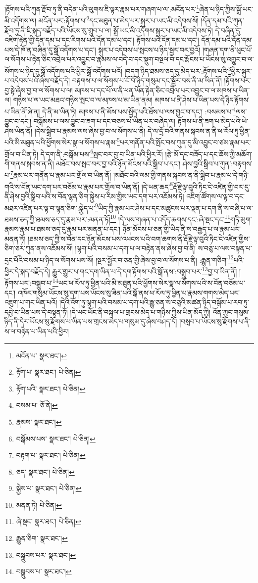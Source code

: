 །རྟོགས་པའི་ཀུན་རྫོབ་ཏུ་ནི་བདེན་པའི་ལུགས་ཇི་ལྟར་རྣམ་པར་གཞག་པ་ལ་:མངོན་པར་\footnote{མངོན་པ་  སྣར་ཐང་། }ཞེན་པ་ཉིད་ཀྱིས་སྒྲོ་ཡང་མི་འདོགས་ལ། མངོན་པར་:རྟོགས་པ་\footnote{རྟོག་པ་  སྣར་ཐང་།  པེ་ཅིན། }དང་མཐུན་པ་མེད་པར་སྐུར་པ་ཡང་མི་འདེབས་སོ། །དོན་དམ་པའི་ཀུན་རྫོབ་ཏུ་ནི་ཇི་སྐད་བརྗོད་པའི་ཡོངས་སུ་གྲུབ་པ་ལ། སྒྲོ་ཡང་མི་འདོགས་སྐུར་པ་ཡང་མི་འདེབས་ཏེ། དེ་བཞིན་དུ་འཇིག་རྟེན་གྱི་དོན་དམ་པ་དང་རིགས་པའི་དོན་དམ་པ་དང་། རྟོགས་པའི་དོན་དམ་པ་དང་། དོན་དམ་པའི་དོན་དམ་པས་དེ་ཁོ་ན་བཞིན་དུ་སྒྲོ་འདོགས་པ་དང་། སྐུར་པ་འདེབས་པ་སྤངས་པ་ཉིད་སྦྱར་བར་བྱའོ། །གཞན་དག་ནི་ཕུང་པོ་ལ་སོགས་པ་རྟེན་ཅིང་འབྲེལ་པར་འབྱུང་བ་རྣམས་ལ་བདེ་བ་དང་སྡུག་བསྔལ་བ་དང་རྨོངས་པ་ཡོངས་སུ་འགྱུར་བ་ལ་སོགས་པ་ཉིད་དུ་སྒྲོ་འདོགས་པའི་ཕྱིར་སྒྲོ་འདོགས་པའོ། །བདག་ཉིད་ཐམས་ཅད་དུ་མེད་པར་:རྟོགས་པའི་\footnote{རྟོག་པའི་  སྣར་ཐང་།  པེ་ཅིན། }ཕྱིར་སྐུར་པ་འདེབས་པའོ་ཞེས་བརྗོད་དེ། བརྟགས་པ་ལ་སོགས་པ་ངོ་བོ་ཉིད་གསུམ་དང་སྦྱོར་བས་ནི་མ་ཡིན་ནོ། །རྟོགས་པར་བྱ་སྟེ་ཞེས་བྱ་བ་ལ་སོགས་པ་ལ། མཁས་པ་དང་པོ་ལ་ནི་ཕན་ཡོན་རྟེན་ཅིང་འབྲེལ་པར་འབྱུང་བ་ལ་མཁས་པ་ཡིན་ལ། གཉིས་པ་ལ་ཡང་མཐའ་གཉིས་སྤང་བ་ལ་མཁས་པ་མ་ཡིན་ནམ། མཁས་པ་ནི་ཤེས་པ་ཡིན་པས་དེ་ཉིད་རྟོགས་པ་ཡིན་ནོ་ཞེ་ན། དེ་ནི་མ་ཡིན་ཏེ། མཁས་པ་ནི་མོས་པས་སྤྱོད་པའི་ཐོས་པ་ལས་བྱུང་བ་དང་། :བསམས་པ་\footnote{བསམ་པ་  ཅོ་ནེ། }ལས་བྱུང་བ་དང་། བསྒོམས་པ་ལས་བྱུང་བ་ཟག་པ་དང་བཅས་པ་ཡིན་པར་བཞེད་ལ། རྟོགས་པ་ནི་ཟག་པ་མེད་པའི་ཡེ་ཤེས་ཡིན་ནོ། །དེས་སྒྲིབ་པ་རྣམས་ལས་ཞེས་བྱ་བ་ལ་སོགས་པ་ནི། དེ་ལ་དྲོ་བའི་གནས་སྐབས་ན་ནི་ཕ་རོལ་ཏུ་ཕྱིན་པའི་མི་མཐུན་པའི་ཕྱོགས་སེར་སྣ་ལ་སོགས་པ་རྣམ་\footnote{རྣམས་  སྣར་ཐང་། }པར་གནོན་པའི་སྤོང་བས་ཀུན་དུ་མི་འབྱུང་བ་ཙམ་རྣམ་པར་གྲོལ་བ་ཡིན་ཏེ། དེ་དག་ནི་:བསྒོམ་པས་\footnote{བསྒོམས་པས་  སྣར་ཐང་།  པེ་ཅིན། }སྤང་བར་བྱ་བ་ཡིན་པའི་ཕྱིར་རོ། །རྩེ་མོ་དང་བཟོད་པ་དང་ཆོས་ཀྱི་མཆོག་གི་གནས་སྐབས་ན་ནི། མཐོང་བས་སྤང་བར་བྱ་བའི་ཉོན་མོངས་པའི་སྒྲིབ་པ་དང་། ཤེས་བྱའི་སྒྲིབ་པ་ཀུན་:བརྟགས་པ་\footnote{བརྟག་པ་  སྣར་ཐང་།  པེ་ཅིན། }རྣམ་པར་གནོན་པ་རྣམ་པར་གྲོལ་བ་ཡིན་ནོ། །མཐོང་བའི་ལམ་གྱི་གནས་སྐབས་ན་ནི་སྒྲིབ་པ་རྣམ་པ་དེ་གཉི་གའི་ས་བོན་ཡང་དག་པར་བཅོམ་པ་རྣམ་པར་གྲོལ་བ་ཡིན་ནོ། །དེ་ཡན་ཆད་\footnote{ཅད་  སྣར་ཐང་།  པེ་ཅིན། }རྡོ་རྗེ་ལྟ་བུའི་ཏིང་ངེ་འཛིན་གྱི་བར་དུ་ནི་ཤེས་བྱའི་སྒྲིབ་པའི་ས་བོན་ལྷན་ཅིག་སྐྱེས་པ་རིམ་གྱིས་ཡང་དག་པར་འཇོམས་ཏེ། འཇིག་ཚོགས་ལ་ལྟ་བ་དང་མཐར་འཛིན་པར་ལྟ་བ་ལྷན་ཅིག་:སྐྱེད་པ་\footnote{སྐྱེས་པ་  སྣར་ཐང་།  པེ་ཅིན། }ཡིད་ཀྱི་རྣམ་པར་ཤེས་པ་དང་མཚུངས་པར་ལྡན་པ་དག་ནི་ས་བཞི་པ་ལ་ཐམས་ཅད་ཀྱི་ཐམས་ཅད་དུ་རྣམ་པར་:མནན་ཏོ།\footnote{མནན་ཏེ།  པེ་ཅིན། } །དེ་ལས་གཞན་པ་འདོད་ཆགས་དང་:ཞེ་སྡང་དང་\footnote{ཞེ་སྡང་  སྣར་ཐང་།  པེ་ཅིན། }གཏི་མུག་རྣམས་རྣམ་པ་ཐམས་ཅད་དུ་རྣམ་པར་མནན་པ་དང་། ཉོན་མོངས་པ་ཅན་གྱི་ཡིད་ནི་ས་བརྒྱད་པ་ལ་རྣམ་པར་མནན་ཏོ། །ཐམས་ཅད་ཀྱི་ས་བོན་དང་ཉོན་མོངས་པས་འཕངས་པའི་བག་ཆགས་ནི་རྡོ་རྗེ་ལྟ་བུའི་ཏིང་ངེ་འཛིན་གྱིས་ཅིག་ཅར་ཀུན་ནས་འཇོམས་སོ། །ལྷག་པའི་བསམ་པ་དག་པ་ལ་བརྟེན་ནས་ཞེས་བྱ་བ་ནི། ས་བཅུ་པ་ལས་བསྟན་པ་དྲང་པོའི་བསམ་པ་ཉིད་ལ་སོགས་པས་སོ། །སྔར་སྦྱོར་བ་ཅན་གྱི་ཞེས་བྱ་བ་ལ་སོགས་པ་ནི། :རྒྱུན་གཅིག་\footnote{རྒྱུན་ཅིག་  སྣར་ཐང་། }པའི་ཕྱིར་དེ་སྐད་བརྗོད་དེ། རྒྱུར་གྱུར་པ་གང་དག་ཡིན་པ་དེ་དག་རྟོགས་པའི་སྒོ་ནས་:བསྒྲུབ་པར་\footnote{བསྒྲུབས་པར་  སྣར་ཐང་། }བྱ་བ་ཡིན་ནོ། །རྟོགས་པར་:བསྒྲུབ་པ་\footnote{བསྒྲུབས་པ་  སྣར་ཐང་། }ཡང་ཕ་རོལ་ཏུ་ཕྱིན་པའི་མི་མཐུན་པའི་ཕྱོགས་སེར་སྣ་ལ་སོགས་པའི་ས་བོན་བཅོམ་པ་དང་། འཁོར་གསུམ་ཡོངས་སུ་དག་པས་ཡོངས་སུ་ཟིན་པའི་སྒོ་ནས་ཕ་རོལ་ཏུ་ཕྱིན་པ་རྣམས་གགས་མེད་པར་འཇུག་པ་གང་ཡིན་པའོ། །དེའི་འོག་ཏུ་ལྷག་པའི་བསམ་པ་དག་པའི་རྒྱུ་ཅན་ས་བཅུའི་མཚན་ཉིད་བསྒོམ་པ་རབ་ཏུ་དབྱེ་བ་ཡིན་པས་དེ་བསྟན་ཏོ། །དེ་ཡང་ཡོང་ནི་བསྐལ་པ་གྲངས་མེད་པ་གཉིས་ཀྱིས་ཡིན་མོད་ཀྱི། འོན་ཀྱང་གསུམ་ཉིད་ནི་དེར་ཡོངས་སུ་རྫོགས་པ་ཡིན་པས་གྲངས་མེད་པ་གསུམ་དུ་ཞེས་བཤད་དོ། །བསླབ་པ་ཡོངས་སུ་རྫོགས་པ་ནི་ས་ལ་བརྟེན་པ་ཡིན་པའི་ཕྱིར། 